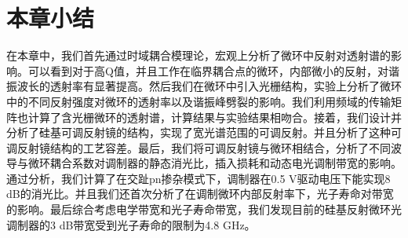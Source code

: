 \section{本章小结}
在本章中，我们首先通过时域耦合模理论，宏观上分析了微环中反射对透射谱的影响。可以看到对于高Q值，并且工作在临界耦合点的微环，内部微小的反射，对谐振波长的透射率有显著提高。然后我们在微环中引入光栅结构，实验上分析了微环中的不同反射强度对微环的透射率以及谐振峰劈裂的影响。我们利用频域的传输矩阵也计算了含光栅微环的透射谱，计算结果与实验结果相吻合。接着，我们设计并分析了硅基可调反射镜的结构，实现了宽光谱范围的可调反射。并且分析了这种可调反射镜结构的工艺容差。最后，我们将可调反射镜与微环相结合，分析了不同波导与微环耦合系数对调制器的静态消光比，插入损耗和动态电光调制带宽的影响。通过分析，我们计算了在交趾pn掺杂模式下，调制器在0.5 V驱动电压下能实现8 dB的消光比。并且我们还首次分析了在调制微环内部反射率下，光子寿命对带宽的影响。最后综合考虑电学带宽和光子寿命带宽，我们发现目前的硅基反射微环光调制器的3 dB带宽受到光子寿命的限制为4.8 GHz。

